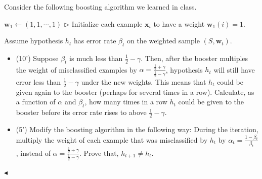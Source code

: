 \documentclass[11pt]{article}
\newenvironment{problem}[2][Problem]{\begin{trivlist}
\item[\hskip \labelsep {\bfseries #1}\hskip \labelsep {\bfseries #2.}]}{\hfill$\blacktriangleleft$\end{trivlist}}
\begin{document}
\begin{problem}{4 (15')} 
Consider the following boosting algorithm we learned in class. 

\begin{algorithm}[H]
    \caption{Boosting algorithm}

    $\bm w_1\gets (1,1,\cdots,1)$ \hfill{$\triangleright$ Initialize each example $\bm x_i$ to have a weight $\bm w_{1}(i)=1$.}


\end{algorithm}

Assume hypothesis $h_t$ has error rate $\beta_t$ on the weighted sample $(S,\bm w_t)$.
\begin{itemize}
    \item [(1)] (10') Suppose $\beta_t$ is much less than $\frac12-\gamma$. Then, after the booster multiples the weight of misclassified examples by $\alpha=\frac{\frac{1}{2}+\gamma}{\frac{1}{2}-\gamma}$, hypothesis $h_t$ will still have error less than $\frac12-\gamma$ under the new weights. This means that $h_t$ could be given again to the booster (perhaps for several times in a row). Calculate, as a function of $\alpha$ and $\beta_t$, how many times in a row $h_t$ could be given to the booster before its error rate rises to above $\frac12-\gamma$. 
    \item [(2)] (5') Modify the boosting algorithm in the following way: During the iteration, multiply the weight of each example that was misclassified by $h_t$ by $\alpha_t=\frac{1-\beta_t}{\beta_t}$, instead of $\alpha=\frac{\frac{1}{2}+\gamma}{\frac{1}{2}-\gamma}$. Prove that, $h_{t+1}\ne h_t$.
\end{itemize}
\end{problem}
\end{document}
